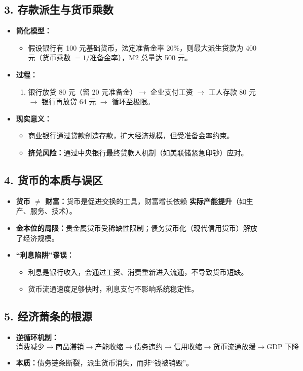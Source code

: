 \subsection*{3. 存款派生与货币乘数}
\begin{itemize}[leftmargin=*, nosep]
  \item \textbf{简化模型：}
    \begin{itemize}
      \item 假设银行有 100 元基础货币，法定准备金率 20\%，则最大派生贷款为 400 元（货币乘数 $=1/\text{准备金率}$），M2 总量达 500 元。
    \end{itemize}
  \item \textbf{过程：}
    \begin{enumerate}[label=\arabic*.]
      \item 银行放贷 80 元（留 20 元准备金）$\to$ 企业支付工资 $\to$ 工人存款 80 元 $\to$ 银行再放贷 64 元 $\to$ 循环至极限。
    \end{enumerate}
  \item \textbf{现实意义：}
    \begin{itemize}
      \item 商业银行通过贷款创造存款，扩大经济规模，但受准备金率约束。
      \item \textbf{挤兑风险：}通过中央银行最终贷款人机制（如美联储紧急印钞）应对。
    \end{itemize}
\end{itemize}

\subsection*{4. 货币的本质与误区}
\begin{itemize}[leftmargin=*, nosep]
  \item \textbf{货币 $\neq$ 财富：}货币是促进交换的工具，财富增长依赖 \textbf{实际产能提升}（如生产、服务、技术）。
  \item \textbf{金本位的局限：}贵金属货币受稀缺性限制；债务货币化（现代信用货币）解放了经济规模。
  \item \textbf{“利息陷阱”谬误：}
    \begin{itemize}
      \item 利息是银行收入，会通过工资、消费重新进入流通，不导致货币短缺。
      \item 货币流通速度足够快时，利息支付不影响系统稳定性。
    \end{itemize}
\end{itemize}

\subsection*{5. 经济萧条的根源}
\begin{itemize}[leftmargin=*, nosep]
  \item \textbf{逆循环机制：}
    \[
      \text{消费减少} \to \text{商品滞销} \to \text{产能收缩} \to \text{债务违约} \to \text{信用收缩} \to \text{货币流通放缓} \to \text{GDP 下降}
    \]
  \item \textbf{本质：}债务链条断裂，派生货币消失，而非“钱被销毁”。
\end{itemize}


